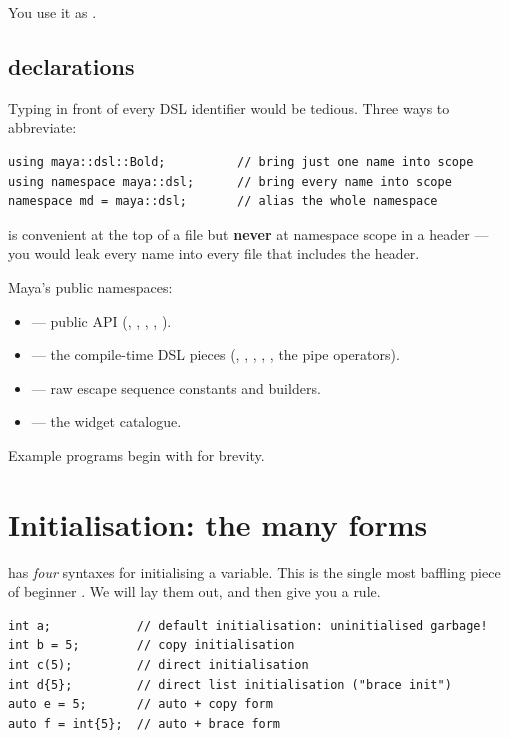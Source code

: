 You use it as .

\subsection{ declarations}

Typing  in front of every DSL identifier would be
tedious. Three ways to abbreviate:

\begin{lstlisting}
using maya::dsl::Bold;          // bring just one name into scope
using namespace maya::dsl;      // bring every name into scope
namespace md = maya::dsl;       // alias the whole namespace
\end{lstlisting}

 is convenient at the top of a 
file but \textbf{never} at namespace scope in a header --- you would
leak every name into every file that includes the header.

Maya's public namespaces:

\begin{itemize}[leftmargin=*]
  \item {} --- public API (, ,
    , , ).
  \item {} --- the compile-time DSL pieces
    (, , , ,
    , the pipe operators).
  \item {} --- raw escape sequence constants and
    builders.
  \item {} --- the widget catalogue.
\end{itemize}

Example programs begin with  for brevity.

\section{Initialisation: the many forms}
\label{sec:cpp:init}

\cpp{} has \emph{four} syntaxes for initialising a variable. This is
the single most baffling piece of beginner \cpp{}. We will lay them
out, and then give you a rule.

\begin{lstlisting}
int a;            // default initialisation: uninitialised garbage!
int b = 5;        // copy initialisation
int c(5);         // direct initialisation
int d{5};         // direct list initialisation ("brace init")
auto e = 5;       // auto + copy form
auto f = int{5};  // auto + brace form
\end{lstlisting}

